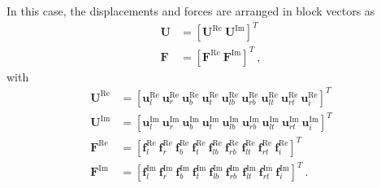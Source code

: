 In this case, the displacements and forces are arranged in block vectors as
\begin{align*}
\mathbf{U} &= \left[\mathbf{U}^\text{Re}\ \mathbf{U}^\text{Im}\right]^T\\
\mathbf{F} &= \left[\mathbf{F}^\text{Re}\ \mathbf{F}^\text{Im}\right]^T \ ,
\end{align*}
with
\begin{align*}
\mathbf{U}^\text{Re} &= \left[\mathbf{u}^\text{Re}_l\ \mathbf{u}^\text{Re}_r\ \mathbf{u}^\text{Re}_b\ \mathbf{u}^\text{Re}_t\ \mathbf{u}^\text{Re}_{lb}\ \mathbf{u}^\text{Re}_{rb}\ \mathbf{u}^\text{Re}_{lt}\ \mathbf{u}^\text{Re}_{rt}\ \mathbf{u}^\text{Re}_{i}\right]^T\\
\mathbf{U}^\text{Im} &=\left[\mathbf{u}^\text{Im}_l\ \mathbf{u}^\text{Im}_r\ \mathbf{u}^\text{Im}_b\ \mathbf{u}^\text{Im}_t\ \mathbf{u}^\text{Im}_{lb}\ \mathbf{u}^\text{Im}_{rb}\ \mathbf{u}^\text{Im}_{lt}\ \mathbf{u}^\text{Im}_{rt}\ \mathbf{u}^\text{Im}_{i}\right]^T \\
\mathbf{F}^\text{Re} &= \left[\mathbf{f}^\text{Re}_l\ \mathbf{f}^\text{Re}_r\ \mathbf{f}^\text{Re}_b\ \mathbf{f}^\text{Re}_t\ \mathbf{f}^\text{Re}_{lb}\ \mathbf{f}^\text{Re}_{rb}\ \mathbf{f}^\text{Re}_{lt}\ \mathbf{f}^\text{Re}_{rt}\ \mathbf{f}^\text{Re}_{i}\right]^T\\
\mathbf{F}^\text{Im} &= \left[\mathbf{f}^\text{Im}_l\ \mathbf{f}^\text{Im}_r\ \mathbf{f}^\text{Im}_b\ \mathbf{f}^\text{Im}_t\ \mathbf{f}^\text{Im}_{lb}\ \mathbf{f}^\text{Im}_{rb}\ \mathbf{f}^\text{Im}_{lt}\ \mathbf{f}^\text{Im}_{rt}\ \mathbf{f}^\text{Im}_{i}\right]^T \ .
\end{align*}

